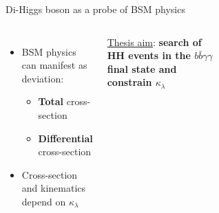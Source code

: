 \begin{frame}{Di-Higgs boson as a probe of BSM physics}

\begin{columns}
\begin{itemize}
    \item BSM physics can manifest as deviation:
    \begin{itemize}
        \item \textbf{\textcolor{HHred}{Total}} cross-section
        \item \textbf{\textcolor{HHturquoise_m}{Differential}} cross-section
    \end{itemize}
    \item Cross-section and kinematics depend on $\kappa_{\lambda}$ 
\end{itemize}
\underline{Thesis aim}: \textbf{search of HH events in the $b \bar{b}\gamma\gamma$ final state and constrain $\kappa_{\lambda}$}


\begin{figure}
    \centering
\end{figure}

\begin{figure}
    \centering
\end{figure}

\end{columns}



\end{frame}